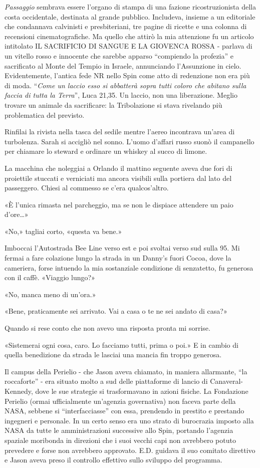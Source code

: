 \emph{Passaggio} sembrava essere l'organo di stampa di una fazione
ricostruzionista della costa occidentale, destinata al grande pubblico.
Includeva, insieme a un editoriale che condannava calvinisti e
presbiteriani, tre pagine di ricette e una colonna di recensioni
cinematografiche. Ma quello che attirò la mia attenzione fu un articolo
intitolato I{L SACRIFICIO DI SANGUE E LA GIOVENCA ROSSA} - parlava di un
vitello rosso e innocente che sarebbe apparso ``compiendo la profezia''
e sacrificato al Monte del Tempio in Israele, annunciando l'Assunzione
in cielo. Evidentemente, l'antica fede NR nello Spin come atto di
redenzione non era più di moda. ``\emph{Come un laccio esso si abbatterà
	sopra tutti coloro che abitano sulla faccia di tutta la Terra}'', Luca
21,35. Un laccio, non una liberazione. Meglio trovare un animale da
sacrificare: la Tribolazione si stava rivelando più problematica del
previsto.

Rinfilai la rivista nella tasca del sedile mentre l'aereo incontrava
un'area di turbolenza. Sarah si accigliò nel sonno. L'uomo d'affari
russo suonò il campanello per chiamare lo steward e ordinare un whiskey
al succo di limone.

\separatorefiori

La macchina che noleggiai a Orlando il mattino seguente aveva due fori
di proiettile stuccati e verniciati ma ancora visibili sulla portiera
dal lato del passeggero. Chiesi al commesso se c'era qualcos'altro.

«È l'unica rimasta nel parcheggio, ma se non le dispiace attendere un
paio d'ore\ldots»

«No,» tagliai corto, «questa va bene.»

Imboccai l'Autostrada Bee Line verso est e poi svoltai verso sud sulla
95. Mi fermai a fare colazione lungo la strada in un Danny's fuori
Cocoa, dove la cameriera, forse intuendo la mia sostanziale condizione
di senzatetto, fu generosa con il caffè. «Viaggio lungo?»

«No, manca meno di un'ora.»

«Bene, praticamente sei arrivato. Vai a casa o te ne sei andato di
casa?»

Quando si rese conto che non avevo una risposta pronta mi sorrise.

«Sistemerai ogni cosa, caro. Lo facciamo tutti, prima o poi.» E in
cambio di quella benedizione da strada le lasciai una mancia fin troppo
generosa.

Il campus della Perielio - che Jason aveva chiamato, in maniera
allarmante, ``la roccaforte'' - era situato molto a sud delle
piattaforme di lancio di Canaveral-Kennedy, dove le sue strategie si
trasformavano in azioni fisiche. La Fondazione Perielio (ormai
ufficialmente un'agenzia governativa) non faceva parte della NASA,
sebbene si ``interfacciasse'' con essa, prendendo in prestito e
prestando ingegneri e personale. In un certo senso era uno strato di
burocrazia imposto alla NASA da tutte le amministrazioni successive allo
Spin, portando l'agenzia spaziale moribonda in direzioni che i suoi
vecchi capi non avrebbero potuto prevedere e forse non avrebbero
approvato. E.D. guidava il suo comitato direttivo e Jason aveva preso il
controllo effettivo sullo sviluppo del programma.

